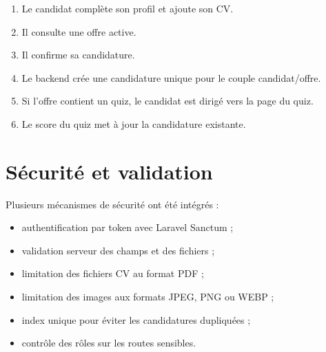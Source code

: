 \begin{enumerate}
    \item Le candidat complète son profil et ajoute son CV.
    \item Il consulte une offre active.
    \item Il confirme sa candidature.
    \item Le backend crée une candidature unique pour le couple candidat/offre.
    \item Si l'offre contient un quiz, le candidat est dirigé vers la page du quiz.
    \item Le score du quiz met à jour la candidature existante.
\end{enumerate}


\section{Sécurité et validation}

\noindent
Plusieurs mécanismes de sécurité ont été intégrés :

\begin{itemize}
    \item authentification par token avec Laravel Sanctum ;
    \item validation serveur des champs et des fichiers ;
    \item limitation des fichiers CV au format PDF ;
    \item limitation des images aux formats JPEG, PNG ou WEBP ;
    \item index unique pour éviter les candidatures dupliquées ;
    \item contrôle des rôles sur les routes sensibles.
\end{itemize}
